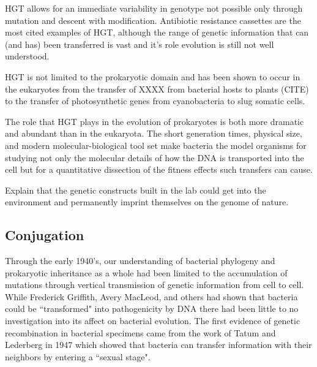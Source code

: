 HGT allows for an immediate variability in genotype not possible only through
mutation and descent with modification. Antibiotic resistance cassettes are the
most cited examples of HGT, although the range of genetic information that can
(and has) been transferred is vast and it's role evolution is still not well
understood.


HGT is not limited to the prokaryotic domain and has been shown to occur in the
eukaryotes from the transfer of XXXX from bacterial hosts to plants (CITE) to
the transfer of photosynthetic genes from cyanobacteria to slug somatic cells.

The role that HGT plays in the evolution of prokaryotes is both more dramatic
and abundant than in the eukaryota. The short generation times, physical size,
and modern molecular-biological tool set make bacteria the model organisms for
studying not only the molecular details of how the DNA is transported into the
cell but for a quantitative dissection of the fitness effects such transfers can
cause.

	Explain that the genetic constructs built in the lab could get
		into the environment and permanently imprint themselves on the
		genome of nature. 

\subsection*{Conjugation}
Through the early 1940's, our understanding of bacterial phylogeny and
prokaryotic inheritance as a whole had been limited to the accumulation of
mutations through vertical transmission of genetic information from cell to
cell. While Frederick Griffith, Avery MacLeod, and others had shown that
bacteria could be ``transformed" into pathogenicity by
DNA\cite{Griffith:1928vg, Avery:2014wx} there had been little to no
investigation into its affect on bacterial evolution. The first evidence of
genetic recombination in bacterial specimens came from the work of Tatum and
Lederberg in 1947 which showed that bacteria can transfer information with their
neighbors by entering a ``sexual stage"\cite{Tatum:1947va}.

